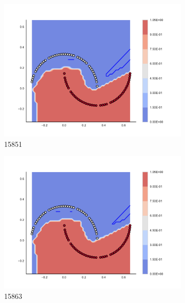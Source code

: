 \begin{figure}[h]
\begin{subfigure}[b]{0.09\textwidth}
    \includegraphics[clip, trim=2.35cm 1.75cm 4.5cm 0cm,width=\textwidth]{img/convergence/15851.pdf}
    \caption{15851}
    \label{fig:convergence_15851}
\end{subfigure}
%
\begin{subfigure}[b]{0.09\textwidth}
    \includegraphics[clip, trim=2.35cm 1.75cm 4.5cm 0cm,width=\textwidth]{img/convergence/15863.pdf}
    \caption{15863}
    \label{fig:convergence_15863}
\end{subfigure}
%
\begin{subfigure}[b]{0.09\textwidth}

\end{subfigure}
\end{figure}
